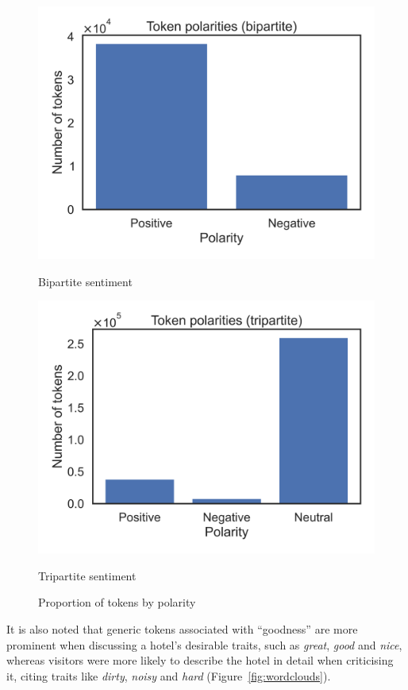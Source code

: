 \documentclass[12pt, a4paper]{pancake-article}
\begin{document}
\begin{figure}[htpb]
	\centering
	\begin{minipage}{0.5\textwidth}
		\centering
		\includegraphics[width=\textwidth]{../results/old/bar_bipartite.png}
		\caption*{Bipartite sentiment}
	\end{minipage}\hfill
	\begin{minipage}{0.5\textwidth}
		\centering
		\includegraphics[width=\textwidth]{../results/old/bar_tripartite.png}
		\caption*{Tripartite sentiment}
	\end{minipage}
	\caption{Proportion of tokens by polarity}
	\label{fig:bars}
\end{figure}

It is also noted that generic tokens associated with ``goodness'' are more
prominent when discussing a hotel's desirable traits, such as \textit{great},
\textit{good} and \textit{nice}, whereas visitors were more likely to
describe the hotel in detail when criticising it, citing traits like
\textit{dirty}, \textit{noisy} and \textit{hard} (Figure~\ref{fig:wordclouds}).
\end{document}
